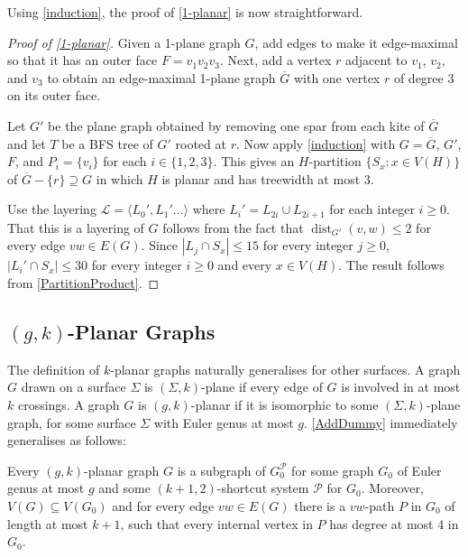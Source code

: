 \documentclass{patmorin}
\DeclareMathOperator{\dist}{dist}
\newcommand{\PP}{\mathcal{P}}
\renewcommand{\ge}{\geqslant}
\renewcommand{\le}{\leqslant}
\begin{document}
Using \cref{induction}, the proof of \cref{1-planar} is now straightforward.

\begin{proof}[Proof of \cref{1-planar}]
	Given a 1-plane graph $G$, add edges to make it edge-maximal so that it has an outer face $F=v_1v_2v_3$. Next, add a vertex $r$ adjacent to $v_1$, $v_2$, and $v_3$ to obtain an edge-maximal 1-plane graph $\overline{G}$ with one vertex $r$ of degree 3 on its outer face.
	
	Let $G'$ be the plane graph obtained by removing one spar from each kite of $\overline{G}$ and let $T$ be a BFS tree of $G'$ rooted at $r$.  Now apply \cref{induction} with $G=\overline{G}$, $G'$, $F$, and $P_i=\{v_i\}$ for each $i\in\{1,2,3\}$.  This gives an $H$-partition $\{S_x:x\in V(H)\}$ of $\overline{G}-\{r\}\supseteq G$ in which $H$ is planar and has treewidth at most 3.
	
	Use the layering $\mathcal{L}=\langle L_0',L_1'\ldots\rangle$ where $L_i'=L_{2i}\cup L_{2i+1}$ for each integer $i\ge 0$. That this is a layering of $G$ follows from the fact that $\dist_{G'}(v,w)\le 2$ for every edge $vw\in E(G)$.  Since $|L_j\cap S_x|\le 15$ for every integer $j\ge 0$, $|L_i'\cap S_x|\le 30$ for every integer $i\ge 0$ and every $x\in V(H)$. The result follows from \cref{PartitionProduct}. 
\end{proof}

\subsection{\boldmath $(g,k)$-Planar Graphs}

The definition of $k$-planar graphs naturally generalises for other surfaces. A graph $G$ drawn on a surface $\Sigma$ is $(\Sigma,k)$-plane if every edge of $G$ is involved in at most $k$ crossings.  A graph $G$ is $(g,k)$-planar if it is isomorphic to some $(\Sigma,k)$-plane graph, for some surface $\Sigma$ with Euler genus at most $g$. \cref{AddDummy} immediately generalises as follows:

\begin{obs}
\label{gAddDummy}
Every $(g,k)$-planar graph $G$ is a subgraph of $G_0^\PP$ for some graph $G_0$ of Euler genus at most $g$ and some $(k+1,2)$-shortcut system $\PP$ for $G_0$. Moreover, $V(G) \subseteq V(G_0)$ and for every edge $vw \in E(G)$ there is a $vw$-path $P$ in $G_0$ of length at most $k+1$, such that every internal vertex in $P$ has degree at most $4$ in $G_0$.
\end{obs}
\end{document}

